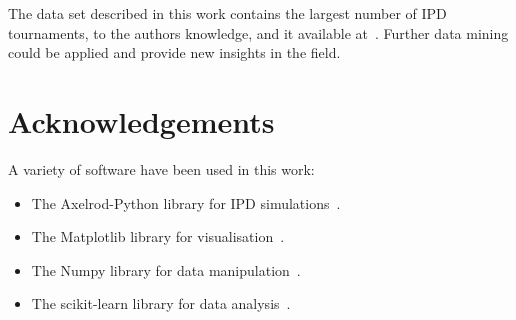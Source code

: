 \documentclass{article}
\begin{document}
The data set described in this work contains the largest number of IPD tournaments,
to the authors knowledge, and it available at~\cite{data}. Further data mining
could be applied and provide new insights in the field.




\section{Acknowledgements}

A variety of software have been used in this work:

\begin{itemize}
    \item The Axelrod-Python library for IPD simulations~\cite{axelrodproject}.
    \item The Matplotlib library for visualisation~\cite{hunter2007matplotlib}.
    \item The Numpy library for data manipulation~\cite{walt2011numpy}.
    \item The scikit-learn library for data analysis~\cite{scikit-learn}.
\end{itemize}

\appendix


% 


\end{document}
